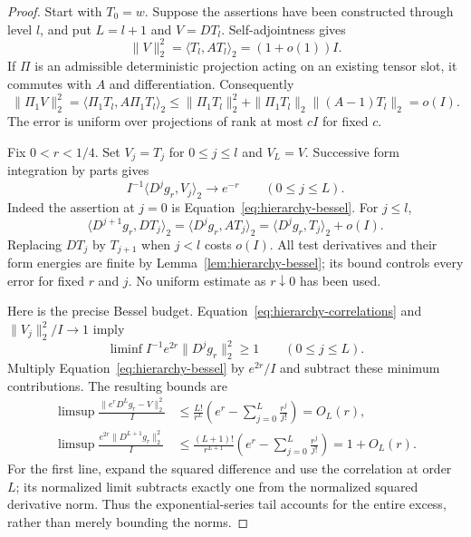 \begin{proof}
Start with $T_0=w$.  Suppose the assertions have been constructed through
level $l$, and put $L=l+1$ and $V=DT_l$.  Self-adjointness gives
\begin{equation}\label{eq:hierarchy-raw-derivative}
 \|V\|_2^2=\langle T_l,AT_l\rangle_2=(1+o(1))I.
\end{equation}
If $\Pi$ is an admissible deterministic projection acting on an existing
tensor slot, it commutes with $A$ and differentiation.  Consequently
\[
 \|\Pi_1V\|_2^2
 =\langle\Pi_1T_l,A\Pi_1T_l\rangle_2
 \le\|\Pi_1T_l\|_2^2+
       \|\Pi_1T_l\|_2\|(A-1)T_l\|_2=o(I).
\]
The error is uniform over projections of rank at most $cI$ for fixed $c$.

Fix $0<r<1/4$.  Set $V_j=T_j$ for $0\le j\le l$ and $V_L=V$.
Successive form integration by parts gives
\begin{equation}\label{eq:hierarchy-correlations}
 I^{-1}\langle D^jg_r,V_j\rangle_2\longrightarrow e^{-r}
 \qquad(0\le j\le L).
\end{equation}
Indeed the assertion at $j=0$ is
Equation~\eqref{eq:hierarchy-bessel}.  For $j\le l$,
\[
 \langle D^{j+1}g_r,DT_j\rangle_2
 =\langle D^jg_r,AT_j\rangle_2
 =\langle D^jg_r,T_j\rangle_2+o(I).
\]
Replacing $DT_j$ by $T_{j+1}$ when $j<l$ costs $o(I)$.
All test derivatives and their form energies are finite by
Lemma~\ref{lem:hierarchy-bessel}; its bound controls every error for
fixed $r$ and $j$.  No uniform estimate as $r\downarrow0$ has been used.

Here is the precise Bessel budget.  Equation~\eqref{eq:hierarchy-correlations}
and $\|V_j\|_2^2/I\to1$ imply
\[
 \liminf I^{-1}e^{2r}\|D^jg_r\|_2^2\ge1
 \qquad(0\le j\le L).
\]
Multiply Equation~\eqref{eq:hierarchy-bessel} by $e^{2r}/I$ and subtract
these minimum contributions.  The resulting bounds are
\begin{align}
 \limsup\frac{\|e^rD^Lg_r-V\|_2^2}{I}
 &\le\frac{L!}{r^L}
       \left(e^r-\sum_{j=0}^{L}\frac{r^j}{j!}\right)=O_L(r),
 \label{eq:hierarchy-budget-error}\\
 \limsup\frac{e^{2r}\|D^{L+1}g_r\|_2^2}{I}
 &\le\frac{(L+1)!}{r^{L+1}}
       \left(e^r-\sum_{j=0}^{L}\frac{r^j}{j!}\right)=1+O_L(r).
 \label{eq:hierarchy-budget-energy}
\end{align}
For the first line, expand the squared difference and use the correlation
at order $L$; its normalized limit subtracts exactly one from the
normalized squared derivative norm.  Thus the exponential-series tail
accounts for the entire excess, rather than merely bounding the norms.


\end{proof}
